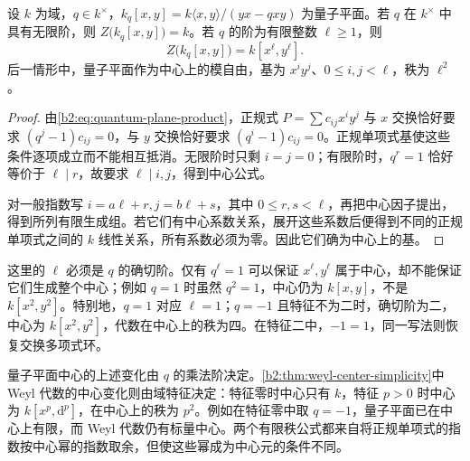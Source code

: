 \begin{proposition}\label{b2:prop:quantum-plane-center}
	设 \(k\) 为域，\(q\in k^\times\)，\(k_q[x,y]=k\langle x,y\rangle/(yx-qxy)\) 为量子平面。若 \(q\) 在 \(k^\times\) 中具有无限阶，则 \(Z\bigl(k_q[x,y]\bigr)=k\)。若 \(q\) 的阶为有限整数 \(\ell\ge1\)，则
	\[
		Z\bigl(k_q[x,y]\bigr)=k[x^\ell,y^\ell].
	\]
	后一情形中，量子平面作为中心上的模自由，基为 \(x^iy^j\)、\(0\le i,j<\ell\)，秩为 \(\ell^2\)。
\end{proposition}
\begin{proof}
	由\eqref{b2:eq:quantum-plane-product}，正规式 \(P=\sum c_{ij}x^iy^j\) 与 \(x\) 交换恰好要求 \((q^j-1)c_{ij}=0\)，与 \(y\) 交换恰好要求 \((q^i-1)c_{ij}=0\)。正规单项式基使这些条件逐项成立而不能相互抵消。无限阶时只剩 \(i=j=0\)；有限阶时，\(q^r=1\) 恰好等价于 \(\ell\mid r\)，故要求 \(\ell\mid i,j\)，得到中心公式。

	对一般指数写 \(i=a\ell+r,j=b\ell+s\)，其中 \(0\le r,s<\ell\)，再把中心因子提出，得到所列有限生成组。若它们有中心系数关系，展开这些系数后便得到不同的正规单项式之间的 \(k\) 线性关系，所有系数必须为零。因此它们确为中心上的基。
\end{proof}

这里的 \(\ell\) 必须是 \(q\) 的确切阶。仅有 \(q^\ell=1\) 可以保证 \(x^\ell,y^\ell\) 属于中心，却不能保证它们生成整个中心；例如 \(q=1\) 时虽然 \(q^2=1\)，中心仍为 \(k[x,y]\)，不是 \(k[x^2,y^2]\)。特别地，\(q=1\) 对应 \(\ell=1\)；\(q=-1\) 且特征不为二时，确切阶为二，中心为 \(k[x^2,y^2]\)，代数在中心上的秩为四。在特征二中，\(-1=1\)，同一写法则恢复交换多项式环。

\ProseParagraphBreak
量子平面中心的上述变化由 \(q\) 的乘法阶决定。\cref{b2:thm:weyl-center-simplicity}中 Weyl 代数的中心变化则由域特征决定：特征零时中心只有 \(k\)，特征 \(p>0\) 时中心为 \(k[x^p,\mathrm{d}^p]\)，在中心上的秩为 \(p^2\)。例如在特征零中取 \(q=-1\)，量子平面已在中心上有限，而 Weyl 代数仍有标量中心。两个有限秩公式都来自将正规单项式的指数按中心幂的指数取余，但使这些幂成为中心元的条件不同。
